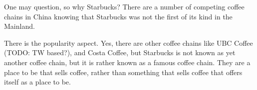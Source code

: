 One may question, so why Starbucks? There are a number of competing coffee
chains in China knowing that Starbucks was not the first of its kind in the
Mainland.

There is the popularity aspect. Yes, there are other coffee chains like UBC
Coffee (TODO: TW based?), and Costa Coffee, but Starbucks is not known as yet
another coffee chain, but it is rather known as a famous coffee chain. They are
a place to be that sells coffee, rather than something that sells coffee that
offers itself as a place to be.


